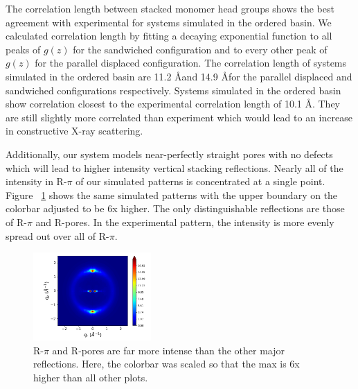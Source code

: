 \documentclass[journal=jpcbfk,manusciprt=article]{achemso}
\begin{document}
  The correlation length between stacked monomer head groups shows the best agreement with
  experimental for systems simulated in the ordered basin.
  We calculated correlation length by fitting a decaying exponential function to all peaks of
  $g(z)$ for the sandwiched configuration and to every other peak of $g(z)$ for the parallel
  displaced configuration. The correlation length of systems simulated in the ordered basin are
  11.2 \AA and 14.9 \AA	for the parallel displaced and sandwiched configurations respectively. 
  Systems simulated in the ordered basin show correlation closest to the experimental correlation
  length of 10.1 \AA. They are still slightly more correlated than experiment which would lead to
  an increase in constructive X-ray scattering. 
  
  Additionally, our system models near-perfectly straight pores with no defects which will
  lead to higher intensity vertical stacking reflections. Nearly all of the intensity in R-$\pi$
  of our simulated patterns is concentrated at a single point. Figure ~\ref{fig:intense_rpi}
  shows the same simulated patterns with the upper boundary on the colorbar adjusted to be 6x
  higher. The only distinguishable reflections are those of R-$\pi$ and R-pores. In the 
  experimental pattern, the intensity is more evenly spread out over all of R-$\pi$. 
  
  \begin{figure}
  \centering
  \includegraphics[width=0.4\textwidth]{sandwich_rzplot_highlimit_cbar.png}
  \caption{R-$\pi$ and R-pores are far more intense than the other major reflections. Here, the 
  colorbar was scaled so that the max is 6x higher than all other plots.}\label{fig:intense_rpi}
  \end{figure}
\end{document}
